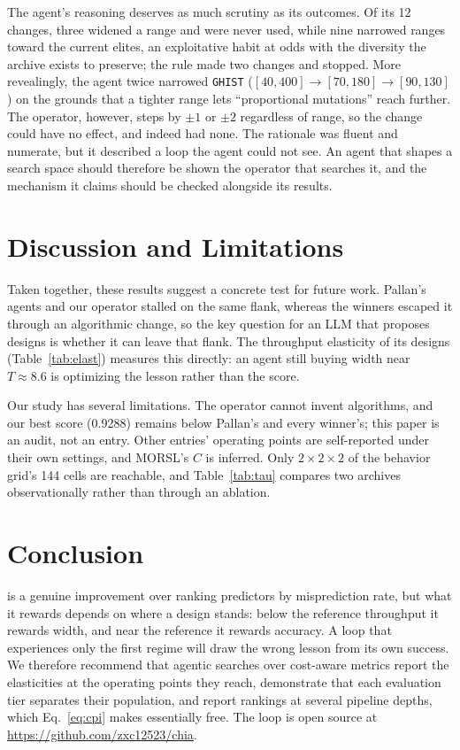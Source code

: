 \documentclass[conference]{IEEEtran}
\newcommand{\vfs}{\text{VFS}}
\begin{document}
The agent's reasoning deserves as much scrutiny as its outcomes. Of its 12
changes, three widened a range and were never used, while nine narrowed ranges
toward the current elites, an exploitative habit at odds with the diversity the
archive exists to preserve; the rule made two changes and stopped. More revealingly, the agent
twice narrowed \texttt{GHIST} ($[40,400]\to[70,180]\to[90,130]$) on the grounds
that a tighter range lets ``proportional mutations'' reach further. The operator,
however, steps by $\pm1$ or $\pm2$ regardless of range, so the change could have
no effect, and indeed had none. The rationale was fluent and numerate, but it
described a loop the agent could not see. An agent that shapes a search space
should therefore be shown the operator that searches it, and the mechanism it
claims should be checked alongside its results.

\section{Discussion and Limitations}

Taken together, these results suggest a concrete test for future work. Pallan's
agents and our operator stalled on the same flank, whereas the winners escaped
it through an algorithmic change, so the key question for an LLM that proposes
designs is whether it can leave that flank. The throughput elasticity of its
designs (Table~\ref{tab:elast}) measures this directly: an agent still buying
width near $T\approx8.6$ is optimizing the lesson rather than the score.

Our study has several limitations. The operator cannot invent algorithms, and
our best score (0.9288) remains below Pallan's and every winner's; this paper is
an audit, not an entry. Other entries' operating points are self-reported under
their own settings, and MORSL's $C$ is inferred. Only $2\times2\times2$ of the
behavior grid's 144 cells are reachable, and Table~\ref{tab:tau} compares two
archives observationally rather than through an ablation.

\section{Conclusion}

\vfs{} is a genuine improvement over ranking predictors by misprediction rate,
but what it rewards depends on where a design stands: below the reference
throughput it rewards width, and near the reference it rewards accuracy. A loop
that experiences only the first regime will draw the wrong lesson from its own
success. We therefore recommend that agentic searches over cost-aware metrics
report the elasticities at the operating points they reach, demonstrate that
each evaluation tier separates their population, and report rankings at several
pipeline depths, which Eq.~\eqref{eq:cpi} makes essentially free. The loop is
open source at \url{https://github.com/zxc12523/chia}.
\end{document}
